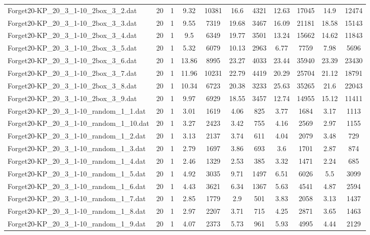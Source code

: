 \begin{table}[!ht]
\begin{tabular}{lcccccccccc}
Forget20-KP\_20\_3\_1-10\_2box\_3\_2.dat & 20 & 1 & 9.32 & 10381 & 16.6 & 4321 & 12.63 & 17045 & 14.9 & 12474 \\
Forget20-KP\_20\_3\_1-10\_2box\_3\_3.dat & 20 & 1 & 9.55 & 7319 & 19.68 & 3467 & 16.09 & 21181 & 18.58 & 15143 \\
Forget20-KP\_20\_3\_1-10\_2box\_3\_4.dat & 20 & 1 & 9.5 & 6349 & 19.77 & 3501 & 13.24 & 15662 & 14.62 & 11843 \\
Forget20-KP\_20\_3\_1-10\_2box\_3\_5.dat & 20 & 1 & 5.32 & 6079 & 10.13 & 2963 & 6.77 & 7759 & 7.98 & 5696 \\
Forget20-KP\_20\_3\_1-10\_2box\_3\_6.dat & 20 & 1 & 13.86 & 8995 & 23.27 & 4033 & 23.44 & 35940 & 23.39 & 23430 \\
Forget20-KP\_20\_3\_1-10\_2box\_3\_7.dat & 20 & 1 & 11.96 & 10231 & 22.79 & 4419 & 20.29 & 25704 & 21.12 & 18791 \\
Forget20-KP\_20\_3\_1-10\_2box\_3\_8.dat & 20 & 1 & 10.34 & 6723 & 20.38 & 3233 & 25.63 & 35265 & 21.6 & 22043 \\
Forget20-KP\_20\_3\_1-10\_2box\_3\_9.dat & 20 & 1 & 9.97 & 6929 & 18.55 & 3457 & 12.74 & 14955 & 15.12 & 11411 \\
Forget20-KP\_20\_3\_1-10\_random\_1\_1.dat & 20 & 1 & 3.01 & 1619 & 4.06 & 825 & 3.77 & 1684 & 3.17 & 1113 \\
Forget20-KP\_20\_3\_1-10\_random\_1\_10.dat & 20 & 1 & 3.27 & 2423 & 3.42 & 755 & 4.16 & 2569 & 2.97 & 1155 \\
Forget20-KP\_20\_3\_1-10\_random\_1\_2.dat & 20 & 1 & 3.13 & 2137 & 3.74 & 611 & 4.04 & 2079 & 3.48 & 729 \\
Forget20-KP\_20\_3\_1-10\_random\_1\_3.dat & 20 & 1 & 2.79 & 1697 & 3.86 & 693 & 3.6 & 1701 & 2.87 & 874 \\
Forget20-KP\_20\_3\_1-10\_random\_1\_4.dat & 20 & 1 & 2.46 & 1329 & 2.53 & 385 & 3.32 & 1471 & 2.24 & 685 \\
Forget20-KP\_20\_3\_1-10\_random\_1\_5.dat & 20 & 1 & 4.92 & 3035 & 9.71 & 1497 & 6.51 & 6026 & 5.5 & 3099 \\
Forget20-KP\_20\_3\_1-10\_random\_1\_6.dat & 20 & 1 & 4.43 & 3621 & 6.34 & 1367 & 5.63 & 4541 & 4.87 & 2594 \\
Forget20-KP\_20\_3\_1-10\_random\_1\_7.dat & 20 & 1 & 2.85 & 1779 & 2.9 & 501 & 3.83 & 2058 & 3.13 & 1437 \\
Forget20-KP\_20\_3\_1-10\_random\_1\_8.dat & 20 & 1 & 2.97 & 2207 & 3.71 & 715 & 4.25 & 2871 & 3.65 & 1463 \\
Forget20-KP\_20\_3\_1-10\_random\_1\_9.dat & 20 & 1 & 4.07 & 2373 & 5.73 & 961 & 5.93 & 4995 & 4.44 & 2129 \\

\end{tabular}
\end{table}
